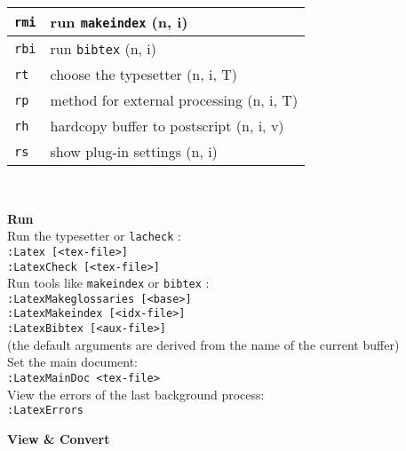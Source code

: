 \documentclass[oneside,10pt,landscape,DIV16]{scrartcl}
\newcommand{\Map}[1] {\textbf{\textasciiacute}\texttt{#1}}
\begin{document}
\begin{multicols}{3}
\begin{center}
\begin{tabular}[]{|p{11mm}|p{62mm}|}
\hline \Map{rmi}  & run \texttt{makeindex}                   \hfill (n, i)\\
\hline \Map{rbi}  & run \texttt{bibtex}                      \hfill (n, i)\\
\hline
\hline \Map{rt}   & choose the typesetter                    \hfill (n, i, T)\\
\hline \Map{rp}   & method for external processing           \hfill (n, i, T)\\
\hline
\hline \Map{rh}   & hardcopy buffer to postscript            \hfill (n, i, v)\\
\hline \Map{rs}   & show plug-in settings                    \hfill (n, i)\\
\hline
\end{tabular}\\[2.5ex]
%
\parbox[t][80mm][t]{70mm}{%
%
\large{\textbf{Run}}\\[1.0ex]
Run the typesetter or \texttt{lacheck} : \\[1.0ex]
\texttt{:Latex [<tex-file>]} \\[1.0ex]
\texttt{:LatexCheck [<tex-file>]} \\[1.0ex]
Run tools like \texttt{makeindex} or \texttt{bibtex} : \\[1.0ex]
\texttt{:LatexMakeglossaries [<base>]} \\[1.0ex]
\texttt{:LatexMakeindex [<idx-file>]} \\[1.0ex]
\texttt{:LatexBibtex [<aux-file>]} \\[1.0ex]
(the default arguments are derived from the name of the current buffer) \\[1.0ex]
Set the main document: \\[1.0ex]
\texttt{:LatexMainDoc <tex-file>} \\[1.0ex]
View the errors of the last background process: \\[1.0ex]
\texttt{:LatexErrors} \\[2.5ex]
}
%
%
\parbox[t][130mm][t]{70mm}{%
%
\large{\textbf{View \& Convert}}\\[1.0ex]
}
\end{center}
\end{multicols}
\end{document}
